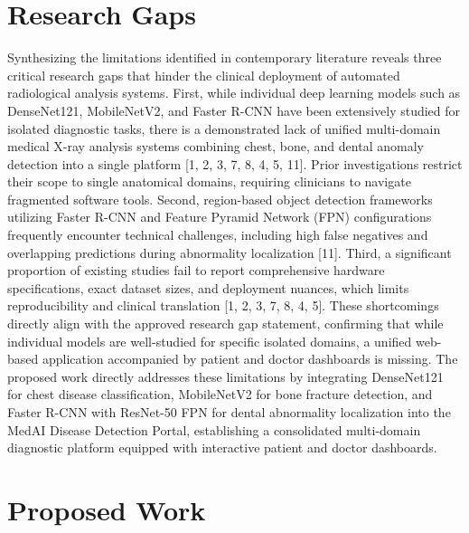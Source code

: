 \documentclass[conference]{IEEEtran}
\begin{document}
\section{Research Gaps}

Synthesizing the limitations identified in contemporary literature reveals three critical research gaps that hinder the clinical deployment of automated radiological analysis systems. First, while individual deep learning models such as DenseNet121, MobileNetV2, and Faster R-CNN have been extensively studied for isolated diagnostic tasks, there is a demonstrated lack of unified multi-domain medical X-ray analysis systems combining chest, bone, and dental anomaly detection into a single platform [1, 2, 3, 7, 8, 4, 5, 11]. Prior investigations restrict their scope to single anatomical domains, requiring clinicians to navigate fragmented software tools. Second, region-based object detection frameworks utilizing Faster R-CNN and Feature Pyramid Network (FPN) configurations frequently encounter technical challenges, including high false negatives and overlapping predictions during abnormality localization [11]. Third, a significant proportion of existing studies fail to report comprehensive hardware specifications, exact dataset sizes, and deployment nuances, which limits reproducibility and clinical translation [1, 2, 3, 7, 8, 4, 5]. These shortcomings directly align with the approved research gap statement, confirming that while individual models are well-studied for specific isolated domains, a unified web-based application accompanied by patient and doctor dashboards is missing. The proposed work directly addresses these limitations by integrating DenseNet121 for chest disease classification, MobileNetV2 for bone fracture detection, and Faster R-CNN with ResNet-50 FPN for dental abnormality localization into the MedAI Disease Detection Portal, establishing a consolidated multi-domain diagnostic platform equipped with interactive patient and doctor dashboards.

\section{Proposed Work}
\end{document}
